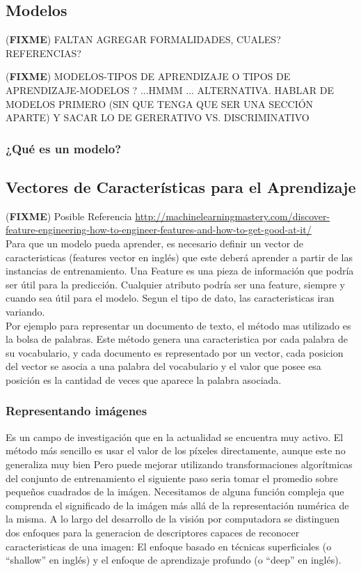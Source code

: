 \documentclass[a4paper,11pt,spanish]{book}
\newcommand*{\FIXME}[1]{{(\textbf{FIXME}) {#1}}}
\begin{document}
    \subsection{Modelos}
    \FIXME{FALTAN AGREGAR FORMALIDADES, CUALES? REFERENCIAS?}

    \FIXME{MODELOS-TIPOS DE APRENDIZAJE O TIPOS DE APRENDIZAJE-MODELOS ? ...HMMM
      ... ALTERNATIVA. HABLAR DE MODELOS PRIMERO (SIN QUE TENGA QUE SER UNA
      SECCIÓN APARTE) Y SACAR LO DE GERERATIVO VS. DISCRIMINATIVO}
      \subsubsection{¿Qué es un modelo?}

\fi

    \subsection{Vectores de Características para el Aprendizaje}
      \FIXME{Posible Referencia \url{http://machinelearningmastery.com/discover-feature-engineering-how-to-engineer-features-and-how-to-get-good-at-it/}}\\
      Para que un modelo pueda aprender, es necesario definir un vector de caracteristicas (features vector en inglés) que este deberá aprender a partir de las instancias de entrenamiento.
      Una Feature es una pieza de información que podría ser útil para la predicción. Cualquier atributo podría ser una feature, siempre y cuando sea útil para el modelo.
      Segun el tipo de dato, las caracteristicas iran variando. \\
      Por ejemplo para representar un documento de texto, el método mas utilizado es la bolsa de palabras.
      Este método genera una caracteristica por cada palabra de su vocabulario, y cada documento es representado por un vector, cada posicion del vector se asocia a una palabra del
      vocabulario y el valor que posee esa posición es la cantidad de veces que aparece la palabra asociada.

      \subsubsection{Representando imágenes}
	Es un campo de investigación que en la actualidad se encuentra muy activo. El método más sencillo es usar el valor de los píxeles directamente, aunque este no generaliza muy bien
	Pero puede mejorar utilizando transformaciones algorítmicas del conjunto de entrenamiento el siguiente paso seria tomar el promedio sobre pequeños cuadrados de la imágen.
	Necesitamos de alguna función compleja que comprenda el significado de la imágen más allá de la representación numérica de la misma.
	A lo largo del desarrollo de la visión por computadora se distinguen dos enfoques para la generacion de descriptores capaces de reconocer caracteristicas de una imagen:
	El enfoque basado en técnicas superficiales (o “shallow” en inglés) y el enfoque de aprendizaje profundo (o “deep” en inglés).
\end{document}
